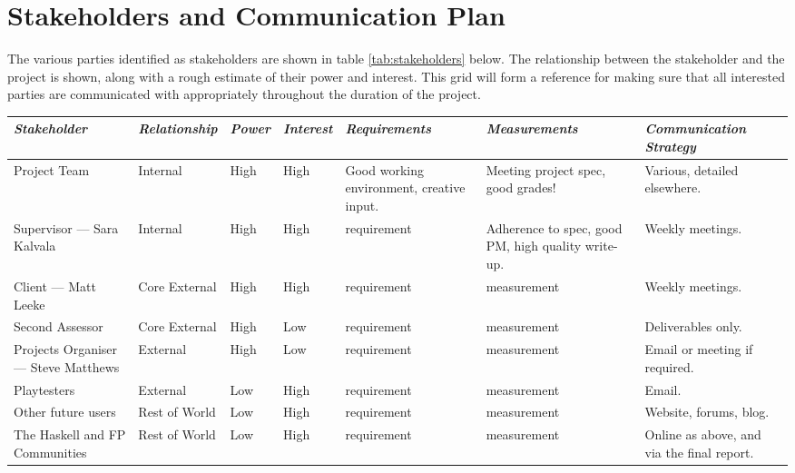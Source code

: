 \section{Stakeholders and Communication Plan}
\label{section:communication}

The various parties identified as stakeholders are shown in table \ref{tab:stakeholders} below. The relationship between the stakeholder and the project is shown, along with a rough estimate of their power and interest. This grid will form a reference for making sure that all interested parties are communicated with appropriately throughout the duration of the project.

\vspace{1em}

\begin{table*}
	\small
	\renewcommand{\arraystretch}{1.6}
	\begin{tabular}{p{9em} p{5em} p{2.5em} p{2.5em} p{9em} p{9em} p{8em}}
		\toprule
		\emph{Stakeholder} & \emph{Relationship} & \emph{Power} & \emph{Interest} & \emph{Requirements} & \emph{Measurements} & \emph{Communication Strategy} \\
		\midrule
		
		Project Team & Internal & High & High & 
		Good working environment, creative input. & 
		Meeting project spec, good grades! & 
		Various, detailed elsewhere. \\
		
		Supervisor --- Sara Kalvala & Internal & High & High & 
		requirement & 
		Adherence to spec, good PM, high quality write-up. & 
		Weekly meetings. \\
		
		Client --- Matt Leeke & Core \mbox{External} & High & High & 
		requirement & 
		measurement & 
		Weekly meetings. \\
		
		Second Assessor & Core \mbox{External} & High & Low & 
		requirement & 
		measurement & 
		Deliverables only. \\
		
		Projects Organiser --- Steve Matthews & External & High & Low & 
		requirement & 
		measurement & 
		Email or meeting if required. \\
		
		Playtesters & External & Low & High & 
		requirement & 
		measurement & 
		Email. \\
		
		Other future users & Rest of World & Low & High & 
		requirement & 
		measurement & 
		Website, forums, blog. \\
		
		The Haskell and FP Communities & Rest of World & Low & High & 
		requirement & 
		measurement & 
		Online as above, and via the final report. \\
		\bottomrule
	\end{tabular}
	\vspace{1.5em}
	\caption{Stakeholders for the project.}
	\label{tab:stakeholders}
\end{table*}

